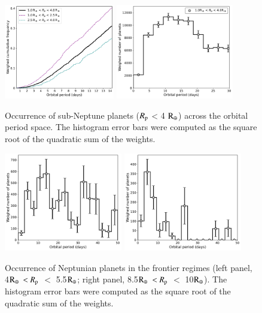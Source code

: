 \documentclass[]{aa}
\begin{document}
\begin{appendix}
\begin{figure}
    \centering
    \includegraphics[width=0.43\textwidth]{cumulative_small.pdf}
    \includegraphics[width=0.457\textwidth]{oc_small.pdf}
    \caption{Occurrence of sub-Neptune planets ($R_{\rm p}$ < 4 $\rm R_{\oplus}$) across the orbital period space. The histogram error bars were computed as the square root of the quadratic sum of the weights.}
    \label{fig:oc_sub}
\end{figure}

\begin{figure}
    \centering
    \includegraphics[width=0.46\textwidth]{oc_nep_4_5.5.pdf}
    \includegraphics[width=0.46\textwidth]{oc_nep_8.5_10.pdf}
    \caption{Occurrence of Neptunian planets in the frontier regimes (left panel, 4$\rm R_{\oplus}$ $<R_{\rm p}$ $<$ 5.5$\rm R_{\oplus}$; right panel, 8.5$\rm R_{\oplus}$ $<R_{\rm p}$ $<$ 10$\rm R_{\oplus}$). The histogram error bars were computed as the square root of the quadratic sum of the weights.}
    \label{fig:oc_transitional}
\end{figure}



\end{appendix}
\end{document}
